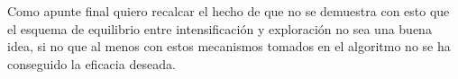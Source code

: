 \documentclass[12pt,a4paper]{article}
\begin{document}
	Como apunte final quiero recalcar el hecho de que no se demuestra con esto que el esquema de equilibrio entre intensificación y exploración no sea una buena idea, si no que al menos con estos mecanismos tomados en el algoritmo no se ha conseguido la eficacia deseada.
	
	
	
	
	
	\newpage
	\clearpage
	
\end{document}
